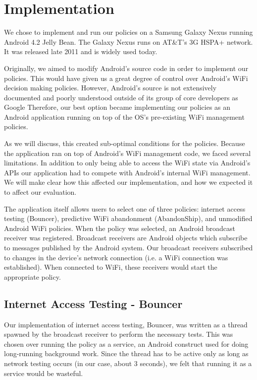 \section{Implementation}
\label{sec:impl}

We chose to implement and run our policies on a Samsung Galaxy Nexus running Android 4.2 Jelly Bean. The Galaxy Nexus runs on AT\&T's 3G HSPA+ network. It was released late 2011 and is widely used today.

Originally, we aimed to modify Android's source code in order to implement our policies. This would have given us a great degree of control over Android's WiFi decision making policies. However, Android's source is not extensively documented and poorly understood outside of its group of core developers as Google \cite{Yaghmour:2013} Therefore, our best option became implementing our policies as an Android application running on top of the OS's pre-existing WiFi management policies.

As we will discuss, this created sub-optimal conditions for the policies. Because the application ran on top of Android's WiFi management code, we faced several limitations. In addition to only being able to access the WiFi state via Android's APIs our application had to compete with Android's internal WiFi management. We will make clear how this affected our implementation, and how we expected it to affect our evaluation.

The application itself allows users to select one of three policies: internet access testing (Bouncer), predictive WiFi abandonment (AbandonShip), and unmodified Android WiFi policies. When the policy was selected, an Android broadcast receiver was registered. Broadcast receivers are Android objects which subscribe to messages published by the Android system. Our broadcast receivers subscribed to changes in the device's network connection (i.e. a WiFi connection was established). When connected to WiFi, these receivers would start the appropriate policy.


\subsection{Internet Access Testing - Bouncer}
Our implementation of internet access testing, Bouncer, was written as a thread spawned by the broadcast receiver to perform the necessary tests. This was chosen over running the policy as a service, an Android construct used for doing long-running background work. Since the thread has to be active only as long as network testing occurs (in our case, about 3 seconds), we felt that running it as a service would be wasteful.

